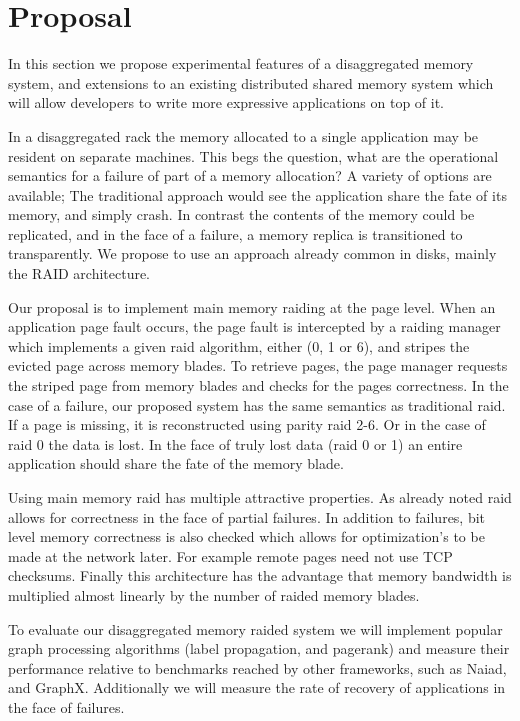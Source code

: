 \section{Proposal}

In this section we propose experimental features of a disaggregated
memory system, and extensions to an existing distributed shared memory
system which will allow developers to write more expressive
applications on top of it.



In a disaggregated rack the memory allocated to a single application
may be resident on separate machines. This begs the question, what are
the operational semantics for a failure of part of a memory
allocation? A variety of options are available; The traditional
approach would see the application share the fate of its memory, and
simply crash. In contrast the contents of the memory could be
replicated, and in the face of a failure, a memory replica is
transitioned to transparently. We propose to use an approach already
common in disks, mainly the RAID architecture. 

Our proposal is to implement main memory raiding at the page level.
When an application page fault occurs, the page fault is intercepted
by a raiding manager which implements a given raid algorithm, either
(0, 1 or 6), and stripes the evicted page across memory blades. To
retrieve pages, the page manager requests the striped page from memory
blades and checks for the pages correctness. In the case of a failure,
our proposed system has the same semantics as traditional raid. If a
page is missing, it is reconstructed using parity raid 2-6. Or in the
case of raid 0 the data is lost. In the face of truly lost data (raid
0 or 1) an entire application should share the fate of the memory
blade.

Using main memory raid has multiple attractive properties. As already
noted raid allows for correctness in the face of partial failures. In
addition to failures, bit level memory correctness is also checked
which allows for optimization's to be made at the network later. For
example remote pages need not use TCP checksums. Finally this
architecture has the advantage that memory bandwidth is multiplied
almost linearly by the number of raided memory blades.

To evaluate our disaggregated memory raided system we will implement
popular graph processing algorithms (label propagation, and pagerank)
and measure their performance relative to benchmarks reached by other
frameworks, such as Naiad, and GraphX. Additionally we will measure
the rate of recovery of applications in the face of failures. 


